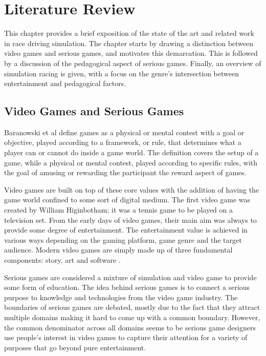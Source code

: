 \chapter{Literature Review}
\label{chp-LiteratureReview}
\label{chp:literature-review}

This chapter provides a brief exposition of the state of the art and related work in race driving simulation. The chapter starts by drawing a distinction between video games and serious games, and motivates this demarcation. This is followed by a discussion of the pedagogical aspect of serious games. Finally, an overview of simulation racing is given, with a focus on the genre's intersection between entertainment and pedagogical factors.

\section{Video Games and Serious Games}
Baranowski et al \cite{yuserious} define games as a physical or mental contest with a goal or objective, played according to a framework, or rule, that determines what a player can or cannot do inside a game world. The definition covers the setup of a game, while a physical or mental contest, played according to specific rules, with the goal of amusing or rewarding the participant the reward aspect of games.

Video games are built on top of these core values with the addition of having the game world confined to some sort of digital medium. The first video game was created by William Higinbotham; it was a tennis game to be played on a television set\cite{stanton2015brief}. From the early days of video games, their main aim was always to provide some degree of entertainment. The entertainment value is achieved in various ways depending on the gaming platform, game genre and the target audience. Modern video games are simply made up of three fundamental components: story, art and software \cite{zyda2005visual}.

Serious games are considered a mixture of simulation and video game to provide some form of education\cite{abt1970}. The idea behind serious games is to connect a serious purpose to knowledge and technologies from the video game industry\cite{michael2005serious}. The boundaries of serious games are debated, mostly due to the fact that they attract multiple domains making it hard to come up with a common boundary. However, the common denominator across all domains seems to be serious game designers use people's interest in video games to capture their attention for a variety of purposes that go beyond pure entertainment\cite{djaouti2011classifying}.


